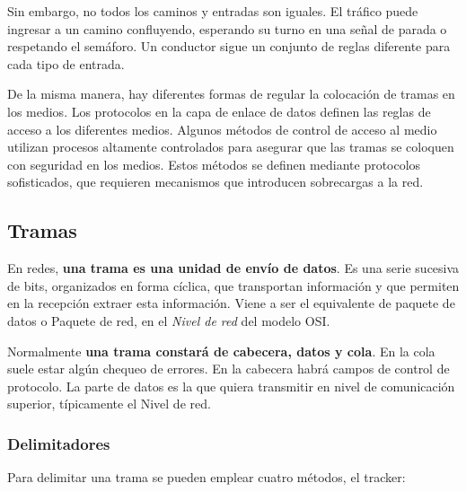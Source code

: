 \documentclass[a4paper]{article}
\begin{document}
	Sin embargo, no todos los caminos y entradas son iguales. El tráfico puede ingresar a un camino confluyendo, esperando su turno en una señal de parada o respetando el semáforo. Un conductor sigue un conjunto de reglas diferente para cada tipo de entrada.   
	
	De la misma manera, hay diferentes formas de regular la colocación de tramas en los medios. Los protocolos en la capa de enlace de datos definen las reglas de acceso a los diferentes medios. Algunos métodos de control de acceso al medio utilizan procesos altamente controlados para asegurar que las tramas se coloquen con seguridad en los medios. Estos métodos se definen mediante protocolos sofisticados, que requieren mecanismos que introducen sobrecargas a la red.
	
	\subsection{Tramas}
	En redes, \textbf{una trama es una unidad de envío de datos}. Es una serie sucesiva de bits, organizados en forma cíclica, que transportan información y que permiten en la recepción extraer esta información. Viene a ser el equivalente de paquete de datos o Paquete de red, en el \textit{Nivel de red} del modelo OSI.
	
	Normalmente \textbf{una trama constará de cabecera, datos y cola}. En la cola suele estar algún chequeo de errores. En la cabecera habrá campos de control de protocolo. La parte de datos es la que quiera transmitir en nivel de comunicación superior, típicamente el Nivel de red.
	
	\subsubsection{Delimitadores}
	
	Para delimitar una trama se pueden emplear cuatro métodos, el tracker:
	\\
	
\end{document}
